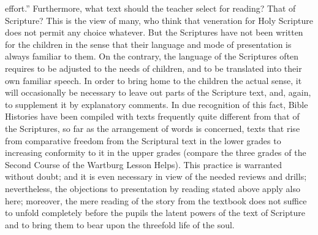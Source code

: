 effort.” Furthermore, what text should the teacher select for reading? That of Scripture? This is the view of many, who think that veneration for Holy Scripture does not permit any choice whatever. But the Scriptures have not been written for the children in the sense that their language and mode of presentation is always familiar to them. On the contrary, the language of the Scriptures often requires to be adjusted to the needs of children, and to be translated into their own familiar speech. In order to bring home to the children the actual sense, it will occasionally be necessary to leave out parts of the Scripture text, and, again, to supplement it by explanatory comments. In due recognition of this fact, Bible Histories have been compiled with texts frequently quite different from that of the Scriptures, so far as the arrangement of words is concerned, texts that rise from comparative freedom from the Scriptural text in the lower grades to increasing conformity to it in the upper grades (compare the three grades of the Second Course of the Wartburg Lesson Helps). This practice is warranted without doubt; and it is even necessary in view of the needed reviews and drills; nevertheless, the objections to presentation by reading stated above apply also here; moreover, the mere reading of the story from the textbook does not suffice to unfold completely before the pupils the latent powers of the text of Scripture and to bring them to bear upon the threefold life of the soul.

